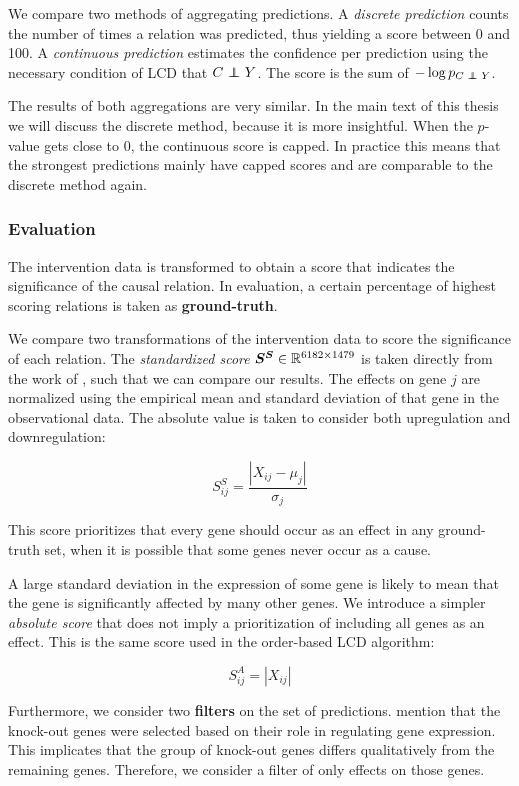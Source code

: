 We compare two methods of aggregating predictions. A \textit{discrete prediction} counts the number of times a relation was predicted, thus yielding a score between 0 and 100. A \textit{continuous prediction} estimates the confidence per prediction using the necessary condition of LCD that $C\operatorname*{{\,\perp\mkern-12mu\perp\,}} Y$. The score is the sum of $-\log p_{C\operatorname*{{\,\perp\mkern-12mu\perp\,}} Y}$.

The results of both aggregations are very similar. In the main text of this thesis we will discuss the discrete method, because it is more insightful. When the $p$-value gets close to $0$, the continuous score is capped. In practice this means that the strongest predictions mainly have capped scores and are comparable to the discrete method again.

\subsubsection{Evaluation}

The intervention data is transformed to obtain a score that indicates the significance of the causal relation. In evaluation, a certain percentage of highest scoring relations is taken as \textbf{ground-truth}. 

We compare two transformations of the intervention data to score the significance of each relation. The \textit{standardized score} $\bm{S^S}\in \mathbb{R}^{6182\times 1479}$ is taken directly from the work of \citet{versteeg2019boosting}, such that we can compare our results. The effects on gene $j$ are normalized using the empirical mean and standard deviation of that gene in the observational data. The absolute value is taken to consider both upregulation and downregulation:

$$
S^S_{ij}=\frac{|X_{ij}-\mu_j|}{\sigma_j}
$$

This score prioritizes that every gene should occur as an effect in any ground-truth set, when it is possible that some genes never occur as a cause.

A large standard deviation in the expression of some gene is likely to mean that the gene is significantly affected by many other genes. We introduce a simpler \textit{absolute score} that does not imply a prioritization of including all genes as an effect. This is the same score used in the order-based LCD algorithm:

$$
S^A_{ij}=|X_{ij}|
$$

Furthermore, we consider two \textbf{filters} on the set of predictions. \citet{kemmeren2014large} mention that the knock-out genes were selected based on their role in regulating gene expression. This implicates that the group of knock-out genes differs qualitatively from the remaining genes. Therefore, we consider a filter of only effects on those genes. 

